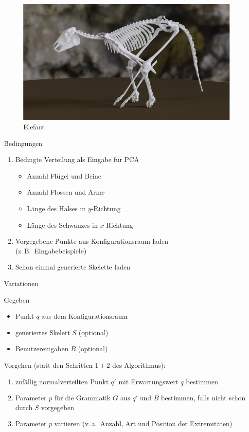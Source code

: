 \documentclass{beamer}
\newcommand{\zb}{z.\,B.\ }
\newcommand{\va}{v.\,a.\ }
\begin{document}
\begin{frame}[focus]
 \begin{figure}
  \includegraphics[width=\textwidth]{../../java_skeleton_generation/example_skeletons/elefant.jpg}
  \caption{Elefant}
 \end{figure}
\end{frame}

\begin{frame}{Bedingungen}
 \begin{enumerate}
  \item Bedingte Verteilung als Eingabe für PCA
  \begin{itemize}
   \item Anzahl Flügel und Beine
   \item Anzahl Flossen und Arme
   \item Länge des Halses in $y$-Richtung
   \item Länge des Schwanzes in $x$-Richtung
  \end{itemize}
  \item Vorgegebene Punkte aus Konfigurationsraum laden\\ (\zb Eingabebeispiele)
  \item Schon einmal generierte Skelette laden
 \end{enumerate}
\end{frame}

\begin{frame}{Variationen}
 \begin{block}{Gegeben}
  \begin{itemize}
   \item Punkt $q$ aus dem Konfigurationsraum
   \item generiertes Skelett $S$ (optional)
   \item Benutzereingaben $B$ (optional)
  \end{itemize}
 \end{block}
 
 Vorgehen (statt den Schritten $1+2$ des Algorithmus):
 \begin{enumerate}
  \item zufällig normalverteilten Punkt $q'$ mit Erwartungswert $q$ bestimmen
  \item Parameter $p$ für die Grammatik $G$ aus $q'$ und $B$ bestimmen, falls nicht schon durch $S$ vorgegeben
  \item Parameter $p$ variieren (\va Anzahl, Art und Position der Extremitäten)
 \end{enumerate}
\end{frame}
\end{document}
